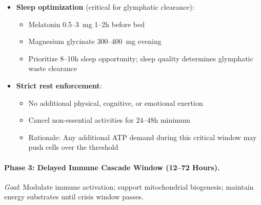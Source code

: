 \begin{itemize}
    \item \textbf{Sleep optimization} (critical for glymphatic clearance):
    \begin{itemize}
        \item Melatonin 0.5--3~mg 1--2h before bed
        \item Magnesium glycinate 300--400~mg evening
        \item Prioritize 8--10h sleep opportunity; sleep quality determines glymphatic waste clearance
    \end{itemize}

    \item \textbf{Strict rest enforcement}:
    \begin{itemize}
        \item No additional physical, cognitive, or emotional exertion
        \item Cancel non-essential activities for 24--48h minimum
        \item Rationale: Any additional ATP demand during this critical window may push cells over the threshold
    \end{itemize}
\end{itemize}

\paragraph{Phase 3: Delayed Immune Cascade Window (12--72 Hours).}

\textit{Goal}: Modulate immune activation; support mitochondrial biogenesis; maintain energy substrates until crisis window passes.

